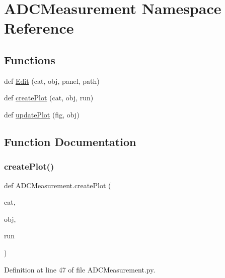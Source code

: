 \hypertarget{namespaceADCMeasurement}{}\section{A\+D\+C\+Measurement Namespace Reference}
\label{namespaceADCMeasurement}
\subsection*{Functions}
\begin{DoxyCompactItemize}
\item 
def \hyperlink{namespaceADCMeasurement_a6da448e6e3b79716e5b7fef078c662d8}{Edit} (cat, obj, panel, path)
\item 
def \hyperlink{namespaceADCMeasurement_ac7c6b7cd094e2747ee244094afbbb7d0}{create\+Plot} (cat, obj, run)
\item 
def \hyperlink{namespaceADCMeasurement_a7de3411faf8be50e833090d1c10cc44f}{update\+Plot} (fig, obj)
\end{DoxyCompactItemize}


\subsection{Function Documentation}
\mbox{\label{namespaceADCMeasurement_ac7c6b7cd094e2747ee244094afbbb7d0}} 
\subsubsection{\texorpdfstring{create\+Plot()}{createPlot()}}
{\footnotesize\ttfamily def A\+D\+C\+Measurement.\+create\+Plot (\begin{DoxyParamCaption}\item[{}]{cat,  }\item[{}]{obj,  }\item[{}]{run }\end{DoxyParamCaption})}



Definition at line 47 of file A\+D\+C\+Measurement.\+py.


